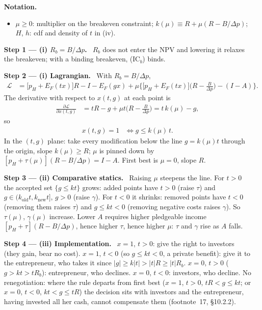 \documentclass[11pt,a4paper]{article}
\newcommand{\notation}{\par\noindent\textbf{Notation.}}
\newcommand{\step}[2]{\par\medskip\noindent\textbf{Step #1 --- #2.}~}
\newcommand{\dpp}{\Delta p}
\begin{document}
\notation
\begin{itemize}
  \item $\mu\ge0$: multiplier on the breakeven constraint; $k(\mu)\equiv R+\mu(R-B/\dpp)$; $H$, $h$: cdf and density of $t$ in (iv).
\end{itemize}

\step{1}{(i) $R_b=B/\dpp$} $R_b$ does not enter the NPV and lowering it relaxes the breakeven; with a binding breakeven, (IC$_b$) binds.

\step{2}{(i) Lagrangian} With $R_b=B/\dpp$,
\begin{align}
  \mathcal L &= \big[p_H+E_F(tx)\big]R-I-E_F(gx)+\mu\Big\{\big[p_H+E_F(tx)\big]\Big(R-\frac{B}{\dpp}\Big)-(I-A)\Big\}. \nonumber
\end{align}
The derivative with respect to $x(t,g)$ at each point is
\begin{align}
  \frac{\partial\mathcal L}{\partial x(t,g)} &= tR-g+\mu t\Big(R-\frac{B}{\dpp}\Big) = t\,k(\mu)-g, \nonumber
\end{align}
so
\begin{align}
  x(t,g)=1 &\iff g\le k(\mu)\,t. \label{r8e14-rule}
\end{align}
In the $(t,g)$ plane: take every modification below the line $g=k(\mu)t$ through the origin, slope $k(\mu)\ge R$; $\mu$ is pinned down by $[p_H+\tau(\mu)](R-B/\dpp)=I-A$. First best is $\mu=0$, slope $R$.

\step{3}{(ii) Comparative statics} Raising $\mu$ steepens the line. For $t>0$ the accepted set $\{g\le kt\}$ grows: added points have $t>0$ (raise $\tau$) and $g\in(k_{\text{old}}t,k_{\text{new}}t]$, $g>0$ (raise $\gamma$). For $t<0$ it shrinks: removed points have $t<0$ (removing them raises $\tau$) and $g\le kt<0$ (removing negative costs raises $\gamma$). So $\tau(\mu)$, $\gamma(\mu)$ increase. Lower $A$ requires higher pledgeable income $[p_H+\tau](R-B/\dpp)$, hence higher $\tau$, hence higher $\mu$: $\tau$ and $\gamma$ rise as $A$ falls.

\step{4}{(iii) Implementation} $x=1$, $t>0$: give the right to investors (they gain, bear no cost). $x=1$, $t<0$ (so $g\le kt<0$, a private benefit): give it to the entrepreneur, who takes it since $|g|\ge k|t|>|t|R\ge|t|R_b$. $x=0$, $t>0$ ($g>kt>tR_b$): entrepreneur, who declines. $x=0$, $t<0$: investors, who decline. No renegotiation: where the rule departs from first best ($x=1$, $t>0$, $tR<g\le kt$; or $x=0$, $t<0$, $kt<g\le tR$) the decision sits with investors and the entrepreneur, having invested all her cash, cannot compensate them (footnote~17, \S10.2.2).
\end{document}
